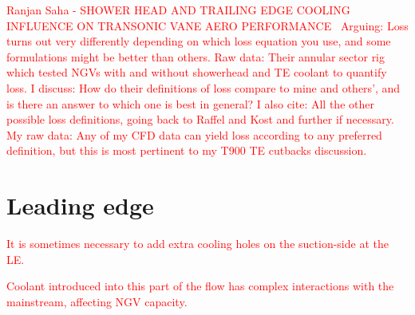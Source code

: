 \documentclass[a4paper, 11pt, twoside]{report}
\begin{document}
\textcolor{red}{Ranjan Saha - SHOWER HEAD AND TRAILING EDGE COOLING INFLUENCE ON TRANSONIC VANE AERO PERFORMANCE~\cite{saha_loss}}
	\textcolor{red}{Arguing: Loss turns out very differently depending on which loss equation you use, and some formulations might be better than others.}
	\textcolor{red}{Raw data: Their annular sector rig which tested NGVs with and without showerhead and TE coolant to quantify loss.}
	\textcolor{red}{I discuss: How do their definitions of loss compare to mine and others', and is there an answer to which one is best in general?}
	\textcolor{red}{I also cite: All the other possible loss definitions, going back to Raffel and Kost and further if necessary.}
	\textcolor{red}{My raw data: Any of my CFD data can yield loss according to any preferred definition, but this is most pertinent to my T900 TE cutbacks discussion.}



\chapter{Leading edge}
\label{chapter_leading_edge}



\textcolor{red}{It is sometimes necessary to add extra cooling holes on the suction-side at the LE.}

\textcolor{red}{Coolant introduced into this part of the flow has complex interactions with the mainstream, affecting NGV capacity.}
 
\end{document}

